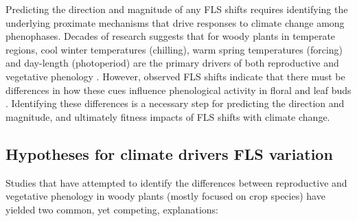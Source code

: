 \documentclass[11pt]{article}
\begin{document}
\noindent Predicting the direction and magnitude of any FLS shifts requires identifying the underlying proximate mechanisms that drive responses to climate change among phenophases. %
Decades of research suggests that for woody plants in temperate regions, cool winter temperatures (chilling), warm spring temperatures (forcing) and day-length (photoperiod) are the primary drivers of both reproductive and vegetative phenology \citep{Forrest2010,Flynn2018}. However, observed FLS shifts indicate that there must be differences in how these cues influence phenological activity in floral and leaf buds \citep{Buonaiuto2020}. %
Identifying these differences is a necessary step for predicting the direction and magnitude, and ultimately fitness impacts of FLS shifts with climate change.\\ %
\subsection*{Hypotheses for climate drivers FLS variation} %
\noindent Studies that have attempted to identify the differences between reproductive and vegetative phenology in woody plants (mostly focused on crop species) have yielded two common, yet competing, explanations:\\
\end{document}
